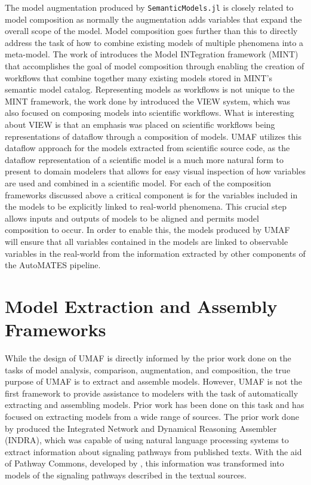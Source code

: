 The model augmentation produced by \texttt{SemanticModels.jl} is closely related to model composition as normally the augmentation adds variables that expand the overall scope of the model.
Model composition goes further than this to directly address the task of how to combine existing models of multiple phenomena into a meta-model.
The work of \citet{gil2018mint} introduces the Model INTegration framework (MINT) that accomplishes the goal of model composition through enabling the creation of workflows that combine together many existing models stored in MINT's semantic model catalog.
Representing models as workflows is not unique to the MINT framework, the work done by \citet{fei2010dataflow} introduced the VIEW system, which was also focused on composing models into scientific workflows.
What is interesting about VIEW is that an emphasis was placed on scientific workflows being representations of dataflow through a composition of models.
UMAF utilizes this dataflow approach for the models extracted from scientific source code, as the dataflow representation of a scientific model is a much more natural form to present to domain modelers that allows for easy visual inspection of how variables are used and combined in a scientific model.
For each of the composition frameworks discussed above a critical component is for the variables included in the models to be explicitly linked to real-world phenomena.
This crucial step allows inputs and outputs of models to be aligned and permits model composition to occur.
In order to enable this, the models produced by UMAF will ensure that all variables contained in the models are linked to observable variables in the real-world from the information extracted by other components of the AutoMATES pipeline.

\section{Model Extraction and Assembly Frameworks \label{sec:rwork_extract_assemble}}
While the design of UMAF is directly informed by the prior work done on the tasks of model analysis, comparison, augmentation, and composition, the true purpose of UMAF is to extract and assemble models.
However, UMAF is not the first framework to provide assistance to modelers with the task of automatically extracting and assembling models.
Prior work has been done on this task and has focused on extracting models from a wide range of sources.
The prior work done by \citet{gyori2017word} produced the Integrated Network and Dynamical Reasoning Assembler (INDRA), which was capable of using natural language processing systems to extract information about signaling pathways from published texts.
With the aid of Pathway Commons, developed by \citet{cerami2010pathway}, this information was transformed into models of the signaling pathways described in the textual sources.


